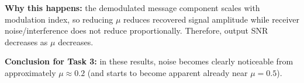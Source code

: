 \textbf{Why this happens:} the demodulated message component scales with modulation index, so reducing \(\mu\) reduces recovered signal amplitude while receiver noise/interference does not reduce proportionally. Therefore, output SNR decreases as \(\mu\) decreases.

\textbf{Conclusion for Task 3:} in these results, noise becomes clearly noticeable from approximately \(\mu \approx 0.2\) (and starts to become apparent already near \(\mu=0.5\)).
